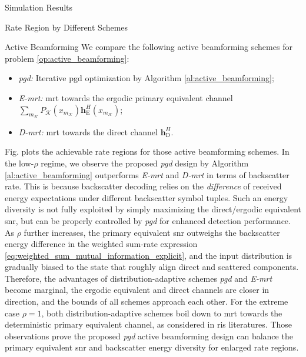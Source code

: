 \documentclass[journal]{IEEEtran}
\begin{document}
\begin{section}{Simulation Results}
\begin{subsection}{Rate Region by Different Schemes}
		\begin{subsubsection}{Active Beamforming}
			We compare the following active beamforming schemes for problem \eqref{op:active_beamforming}:
			\begin{itemize}
				\item \emph{\gls{pgd}:} Iterative \gls{pgd} optimization by Algorithm \ref{al:active_beamforming};
				\item \emph{E-\gls{mrt}:} \gls{mrt} towards the ergodic primary equivalent channel $\sum_{m_{\mathcal{K}}} P_{\mathcal{K}}(x_{m_{\mathcal{K}}}) \boldsymbol{h}_{\mathrm{E}}^H(x_{m_{\mathcal{K}}})$;
				\item \emph{D-\gls{mrt}:} \gls{mrt} towards the direct channel $\boldsymbol{h}_{\mathrm{D}}^H$.
			\end{itemize}

			Fig.  plots the achievable rate regions for those active beamforming schemes.
			In the low-$\rho$ regime, we observe the proposed \emph{\gls{pgd}} design by Algorithm \ref{al:active_beamforming} outperforms \emph{E-\gls{mrt}} and \emph{D-\gls{mrt}} in terms of backscatter rate.
			This is because backscatter decoding relies on the \emph{difference} of received energy expectations under different backscatter symbol tuples.
			Such an energy diversity is not fully exploited by simply maximizing the direct/ergodic equivalent \gls{snr}, but can be properly controlled by \emph{\gls{pgd}} for enhanced detection performance.
			As $\rho$ further increases, the primary equivalent \gls{snr} outweighs the backscatter energy difference in the weighted sum-rate expression \eqref{eq:weighted_sum_mutual_information_explicit}, and the input distribution is gradually biased to the state that roughly align direct and scattered components.
			Therefore, the advantages of distribution-adaptive schemes \emph{\gls{pgd}} and \emph{E-\gls{mrt}} become marginal, the ergodic equivalent and direct channels are closer in direction, and the bounds of all schemes approach each other.
			For the extreme case $\rho=1$, both distribution-adaptive schemes boil down to \gls{mrt} towards the deterministic primary equivalent channel, as considered in \gls{ris} literatures.
			Those observations prove the proposed \emph{\gls{pgd}} active beamforming design can balance the primary equivalent \gls{snr} and backscatter energy diversity for enlarged rate regions.
		\end{subsubsection}


\end{subsection}
\end{section}
\end{document}
